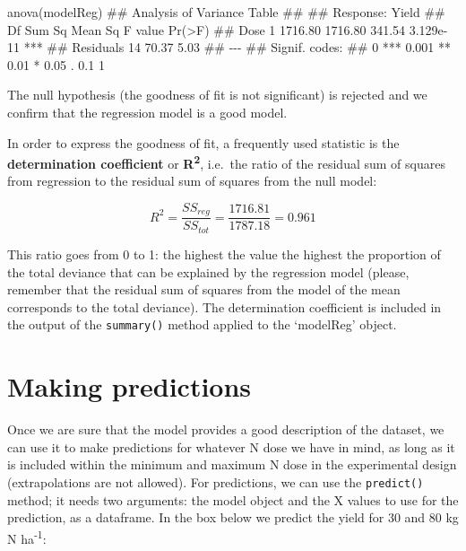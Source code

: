 \documentclass[a4paper,12pt,oneside]{book}
\newenvironment{Shaded}{\begin{snugshade}}{\end{snugshade}}
\newcommand{\DocumentationTok}[1]{#1}
\newcommand{\FunctionTok}[1]{#1}
\newcommand{\NormalTok}[1]{#1}
\begin{document}
\begin{Shaded}
\begin{Highlighting}[]
\FunctionTok{anova}\NormalTok{(modelReg)}
\DocumentationTok{\#\# Analysis of Variance Table}
\DocumentationTok{\#\# }
\DocumentationTok{\#\# Response: Yield}
\DocumentationTok{\#\#           Df  Sum Sq Mean Sq F value    Pr(\textgreater{}F)    }
\DocumentationTok{\#\# Dose       1 1716.80 1716.80  341.54 3.129e{-}11 ***}
\DocumentationTok{\#\# Residuals 14   70.37    5.03                      }
\DocumentationTok{\#\# {-}{-}{-}}
\DocumentationTok{\#\# Signif. codes:  }
\DocumentationTok{\#\# 0 \textquotesingle{}***\textquotesingle{} 0.001 \textquotesingle{}**\textquotesingle{} 0.01 \textquotesingle{}*\textquotesingle{} 0.05 \textquotesingle{}.\textquotesingle{} 0.1 \textquotesingle{} \textquotesingle{} 1}
\end{Highlighting}
\end{Shaded}

The null hypothesis (the goodness of fit is not significant) is rejected and we confirm that the regression model is a good model.

In order to express the goodness of fit, a frequently used statistic is the \textbf{determination coefficient} or \textbf{R\textsuperscript{2}}, i.e.~the ratio of the residual sum of squares from regression to the residual sum of squares from the null model:

\[R^2 = \frac{SS_{reg}}{SS_{tot}} = \frac{1716.81}{1787.18} = 0.961\]

This ratio goes from 0 to 1: the highest the value the highest the proportion of the total deviance that can be explained by the regression model (please, remember that the residual sum of squares from the model of the mean corresponds to the total deviance). The determination coefficient is included in the output of the \texttt{summary()} method applied to the `modelReg' object.

\hypertarget{making-predictions}{%
\section{Making predictions}\label{making-predictions}}

Once we are sure that the model provides a good description of the dataset, we can use it to make predictions for whatever N dose we have in mind, as long as it is included within the minimum and maximum N dose in the experimental design (extrapolations are not allowed). For predictions, we can use the \texttt{predict()} method; it needs two arguments: the model object and the X values to use for the prediction, as a dataframe. In the box below we predict the yield for 30 and 80 kg N ha\textsuperscript{-1}:
\end{document}

